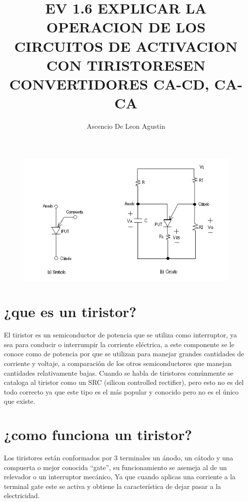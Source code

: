 \documentclass[14pt,letterpaper]{article}
\title{EV 1.6 EXPLICAR LA OPERACION DE LOS CIRCUITOS DE ACTIVACION CON TIRISTORESEN CONVERTIDORES CA-CD, CA-CA}
\author{Ascencio De Leon Agustin}
\begin{document}
\maketitle
\begin{figure}[h!]
\centering
\includegraphics[scale=.9]{inicio}
\end{figure}
\newpage
\section{¿que es un tiristor?}
El tiristor es un semiconductor de potencia que se utiliza como interruptor, ya sea para conducir o interrumpir la corriente eléctrica, a este componente se le conoce como de potencia por que se utilizan para manejar grandes cantidades de corriente y voltaje, a comparación de los otros semiconductores que manejan cantidades relativamente bajas.
Cuando se habla de tiristores comúnmente se cataloga al tiristor como un SRC (silicon controlled rectifier), pero esto no es del todo correcto ya que este tipo es el más popular y conocido pero no es el único que existe.



\section{¿como funciona un tiristor?}
Los tiristores están conformados por 3 terminales un ánodo, un cátodo y una compuerta o mejor conocida “gate”, su funcionamiento se asemeja al de un relevador o un interruptor mecánico, Ya que cuando aplicas una corriente a la terminal gate este se activa y obtiene la característica de dejar pasar a la electricidad.
\end{document}
